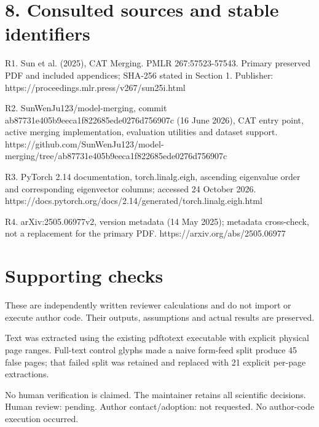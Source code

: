 \documentclass[10pt]{article}
\begin{document}
\section*{8. Consulted sources and stable identifiers}
R1. Sun et al. (2025), CAT Merging. PMLR 267:57523-57543. Primary preserved PDF and included appendices; SHA-256 stated in Section 1. Publisher: https://proceedings.mlr.press/v267/sun25i.html\par
R2. SunWenJu123/model-merging, commit ab87731e405b9eeca1f822685ede0276d756907c (16 June 2026), CAT entry point, active merging implementation, evaluation utilities and dataset support. https://github.com/SunWenJu123/model-merging/tree/ab87731e405b9eeca1f822685ede0276d756907c\par
R3. PyTorch 2.14 documentation, torch.linalg.eigh, ascending eigenvalue order and corresponding eigenvector columns; accessed 24 October 2026. https://docs.pytorch.org/docs/2.14/generated/torch.linalg.eigh.html\par
R4. arXiv:2505.06977v2, version metadata (14 May 2025); metadata cross-check, not a replacement for the primary PDF. https://arxiv.org/abs/2505.06977\par
\section*{Supporting checks}
These are independently written reviewer calculations and do not import or execute author code. Their outputs, assumptions and actual results are preserved.\par
Text was extracted using the existing pdftotext executable with explicit physical page ranges. Full-text control glyphs made a naive form-feed split produce 45 false pages; that failed split was retained and replaced with 21 explicit per-page extractions.\par
No human verification is claimed. The maintainer retains all scientific decisions. Human review: pending. Author contact/adoption: not requested. No author-code execution occurred.\par
\end{document}
